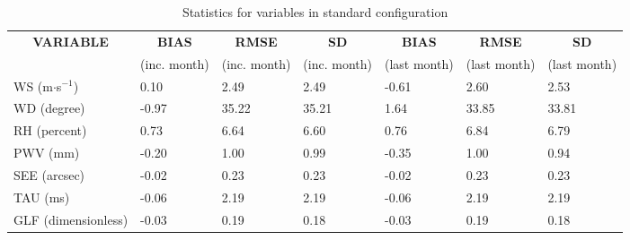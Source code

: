 \documentclass[11pt,english]{article}
\begin{document}
\clearpage
\begin{table}[]
\begin{center}
\begin{tabular}{|l|l|l|l|l|l|l|}
\hline
\multicolumn{1}{|c|}{\cellcolor[HTML]{C0C0C0}\textbf{VARIABLE}} & \multicolumn{1}{c|}{\cellcolor[HTML]{C0C0C0}\textbf{BIAS}} & \multicolumn{1}{c|}{\cellcolor[HTML]{C0C0C0}\textbf{RMSE}} & \multicolumn{1}{c|}{\cellcolor[HTML]{C0C0C0}\textbf{SD}} & \multicolumn{1}{c|}{\cellcolor[HTML]{C0C0C0}\textbf{BIAS}} & \multicolumn{1}{c|}{\cellcolor[HTML]{C0C0C0}\textbf{RMSE}} & \multicolumn{1}{c|}{\cellcolor[HTML]{C0C0C0}\textbf{SD}}\\
\multicolumn{1}{|c|}{\cellcolor[HTML]{C0C0C0}} & \multicolumn{1}{c|}{\cellcolor[HTML]{C0C0C0}(inc. month)} & \multicolumn{1}{c|}{\cellcolor[HTML]{C0C0C0}(inc. month)} & \multicolumn{1}{c|}{\cellcolor[HTML]{C0C0C0}(inc. month)} & \multicolumn{1}{c|}{\cellcolor[HTML]{C0C0C0}(last month)} & \multicolumn{1}{c|}{\cellcolor[HTML]{C0C0C0}(last month)} & \multicolumn{1}{c|}{\cellcolor[HTML]{C0C0C0}(last month)}\\\hline
\cellcolor[HTML]{C0C0C0}WS (m$\cdot$s$^{-1}$) &      0.10  &      2.49  &      2.49  &     -0.61     &      2.60     &      2.53\\
\cellcolor[HTML]{C0C0C0}WD (degree)           &     -0.97  &     35.22  &     35.21  &      1.64     &     33.85     &     33.81\\
\cellcolor[HTML]{C0C0C0}RH (percent)          &      0.73  &      6.64  &      6.60  &      0.76     &      6.84     &      6.79\\
\cellcolor[HTML]{C0C0C0}PWV (mm)              &     -0.20 &      1.00 &      0.99 &     -0.35    &      1.00    &      0.94\\
\cellcolor[HTML]{C0C0C0}SEE (arcsec)          &     -0.02 &      0.23 &      0.23 &     -0.02    &      0.23    &      0.23\\
\cellcolor[HTML]{C0C0C0}TAU (ms)              &     -0.06 &      2.19 &      2.19 &     -0.06    &      2.19    &      2.19\\
\cellcolor[HTML]{C0C0C0}GLF (dimensionless)   &     -0.03 &      0.19 &      0.18 &     -0.03    &      0.19    &      0.18\\
\hline
\end{tabular}
\caption{Statistics for variables in standard configuration}
\end{center}
\end{table}
\end{document}
